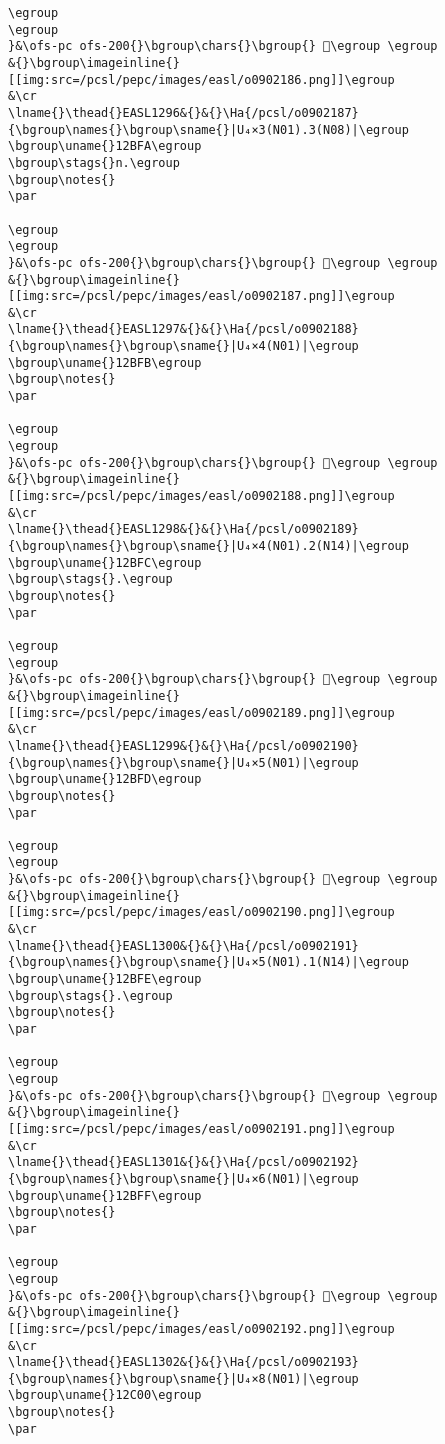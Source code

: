 \begin{verbatim}
\egroup
\egroup
}&\ofs-pc ofs-200{}\bgroup\chars{}\bgroup{} 𒯹\egroup \egroup
&{}\bgroup\imageinline{}[[img:src=/pcsl/pepc/images/easl/o0902186.png]]\egroup
&\cr
\lname{}\thead{}EASL1296&{}&{}\Ha{/pcsl/o0902187}{\bgroup\names{}\bgroup\sname{}|U₄×3(N01).3(N08)|\egroup
\bgroup\uname{}12BFA\egroup
\bgroup\stags{}n.\egroup
\bgroup\notes{}
\par 

\egroup
\egroup
}&\ofs-pc ofs-200{}\bgroup\chars{}\bgroup{} 𒯺\egroup \egroup
&{}\bgroup\imageinline{}[[img:src=/pcsl/pepc/images/easl/o0902187.png]]\egroup
&\cr
\lname{}\thead{}EASL1297&{}&{}\Ha{/pcsl/o0902188}{\bgroup\names{}\bgroup\sname{}|U₄×4(N01)|\egroup
\bgroup\uname{}12BFB\egroup
\bgroup\notes{}
\par 

\egroup
\egroup
}&\ofs-pc ofs-200{}\bgroup\chars{}\bgroup{} 𒯻\egroup \egroup
&{}\bgroup\imageinline{}[[img:src=/pcsl/pepc/images/easl/o0902188.png]]\egroup
&\cr
\lname{}\thead{}EASL1298&{}&{}\Ha{/pcsl/o0902189}{\bgroup\names{}\bgroup\sname{}|U₄×4(N01).2(N14)|\egroup
\bgroup\uname{}12BFC\egroup
\bgroup\stags{}.\egroup
\bgroup\notes{}
\par 

\egroup
\egroup
}&\ofs-pc ofs-200{}\bgroup\chars{}\bgroup{} 𒯼\egroup \egroup
&{}\bgroup\imageinline{}[[img:src=/pcsl/pepc/images/easl/o0902189.png]]\egroup
&\cr
\lname{}\thead{}EASL1299&{}&{}\Ha{/pcsl/o0902190}{\bgroup\names{}\bgroup\sname{}|U₄×5(N01)|\egroup
\bgroup\uname{}12BFD\egroup
\bgroup\notes{}
\par 

\egroup
\egroup
}&\ofs-pc ofs-200{}\bgroup\chars{}\bgroup{} 𒯽\egroup \egroup
&{}\bgroup\imageinline{}[[img:src=/pcsl/pepc/images/easl/o0902190.png]]\egroup
&\cr
\lname{}\thead{}EASL1300&{}&{}\Ha{/pcsl/o0902191}{\bgroup\names{}\bgroup\sname{}|U₄×5(N01).1(N14)|\egroup
\bgroup\uname{}12BFE\egroup
\bgroup\stags{}.\egroup
\bgroup\notes{}
\par 

\egroup
\egroup
}&\ofs-pc ofs-200{}\bgroup\chars{}\bgroup{} 𒯾\egroup \egroup
&{}\bgroup\imageinline{}[[img:src=/pcsl/pepc/images/easl/o0902191.png]]\egroup
&\cr
\lname{}\thead{}EASL1301&{}&{}\Ha{/pcsl/o0902192}{\bgroup\names{}\bgroup\sname{}|U₄×6(N01)|\egroup
\bgroup\uname{}12BFF\egroup
\bgroup\notes{}
\par 

\egroup
\egroup
}&\ofs-pc ofs-200{}\bgroup\chars{}\bgroup{} 𒯿\egroup \egroup
&{}\bgroup\imageinline{}[[img:src=/pcsl/pepc/images/easl/o0902192.png]]\egroup
&\cr
\lname{}\thead{}EASL1302&{}&{}\Ha{/pcsl/o0902193}{\bgroup\names{}\bgroup\sname{}|U₄×8(N01)|\egroup
\bgroup\uname{}12C00\egroup
\bgroup\notes{}
\par 


\end{verbatim}
